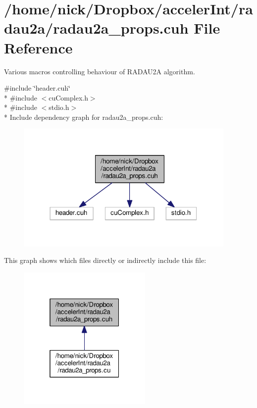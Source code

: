 \hypertarget{radau2a__props_8cuh}{}\section{/home/nick/\+Dropbox/acceler\+Int/radau2a/radau2a\+\_\+props.cuh File Reference}
\label{radau2a__props_8cuh}


Various macros controlling behaviour of R\+A\+D\+A\+U2A algorithm.  


{\ttfamily \#include \char`\"{}header.\+cuh\char`\"{}}\\*
{\ttfamily \#include $<$cu\+Complex.\+h$>$}\\*
{\ttfamily \#include $<$stdio.\+h$>$}\\*
Include dependency graph for radau2a\+\_\+props.\+cuh\+:
\nopagebreak
\begin{figure}[H]
\begin{center}
\leavevmode
\includegraphics[width=302pt]{radau2a__props_8cuh__incl}
\end{center}
\end{figure}
This graph shows which files directly or indirectly include this file\+:
\nopagebreak
\begin{figure}[H]
\begin{center}
\leavevmode
\includegraphics[width=184pt]{radau2a__props_8cuh__dep__incl}
\end{center}
\end{figure}

